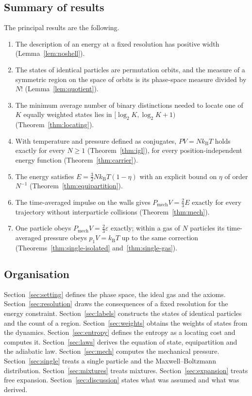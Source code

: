 \documentclass[11pt,a4paper]{article}
\theoremstyle{definition}
\theoremstyle{remark}
\newcommand{\kB}{k_{\mathrm{B}}}
\newcommand{\Pmech}{P_{\mathrm{mech}}}
\begin{document}
\subsection{Summary of results}

The principal results are the following.
\begin{enumerate}[label=(\roman*),leftmargin=2.2em]
\item The description of an energy at a fixed resolution has positive width (Lemma~\ref{lem:noshell}).
\item The states of identical particles are permutation orbits, and the measure of a symmetric region on the space of orbits is its phase-space measure divided by $N!$ (Lemma~\ref{lem:quotient}).
\item The minimum average number of binary distinctions needed to locate one of $K$ equally weighted states lies in $[\log_2K,\log_2K+1)$ (Theorem~\ref{thm:locating}).
\item With temperature and pressure defined as conjugates, $PV=N\kB T$ holds exactly for every $N\ge1$ (Theorem~\ref{thm:igl}), for every position-independent energy function (Theorem~\ref{thm:carrier}).
\item The energy satisfies $E=\tfrac32N\kB T(1-\eta)$ with an explicit bound on $\eta$ of order $N^{-1}$ (Theorem~\ref{thm:equipartition}).
\item The time-averaged impulse on the walls gives $\Pmech V=\tfrac23E$ exactly for every trajectory without interparticle collisions (Theorem~\ref{thm:mech}).
\item One particle obeys $\Pmech V=\tfrac23\varepsilon$ exactly; within a gas of $N$ particles its time-averaged pressure obeys $p_1V=\kB T$ up to the same correction (Theorems~\ref{thm:single-isolated} and~\ref{thm:single-gas}).
\end{enumerate}

\subsection{Organisation}

Section~\ref{sec:setting} defines the phase space, the ideal gas and the axioms.
Section~\ref{sec:resolution} draws the consequences of a fixed resolution for the energy constraint.
Section~\ref{sec:labels} constructs the states of identical particles and the count of a region.
Section~\ref{sec:weights} obtains the weights of states from the dynamics.
Section~\ref{sec:entropy} defines the entropy as a locating cost and computes it.
Section~\ref{sec:laws} derives the equation of state, equipartition and the adiabatic law.
Section~\ref{sec:mech} computes the mechanical pressure.
Section~\ref{sec:single} treats a single particle and the Maxwell--Boltzmann distribution.
Section~\ref{sec:mixtures} treats mixtures.
Section~\ref{sec:expansion} treats free expansion.
Section~\ref{sec:discussion} states what was assumed and what was derived.
\end{document}
